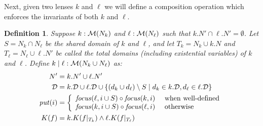\documentclass{article}
\newtheorem{definition}{Definition}
\begin{document}
Next, given two lenses $k$ and $\ell$ we will define a composition operation
which enforces the invariants of both $k$ and $\ell$.
\begin{definition}
    Suppose $k : \mathcal M(N_k)$ and $\ell : \mathcal M(N_\ell)$ such that $k.N' \cap
    \ell.N' = \emptyset$. Let $S = N_k \cap N_\ell$ be the shared domain
    of $k$ and $\ell$, and let $T_k = N_k \cup k.N$ and $T_\ell = N_\ell \cup \ell.N'$
    be called the total domains (including existential variables) of $k$ and $\ell$.
    Define $k\mid\ell : \mathcal M(N_k \cup N_\ell)$ as:
    \begin{align*}
        N' &= k.N' \cup \ell.N' \\
        \mathcal D &= k.\mathcal D \cup \ell.\mathcal D \cup
            \{(d_k \cup d_\ell) \setminus S
            \mid d_k \in k.\mathcal D, d_\ell \in \ell.\mathcal D\} \\
        \mathit{put}(i) &= \left\{\begin{array}{ll}
            \mathit{focus}(\ell,i\cup S) \circ \mathit{focus}(k,i)
                & \mbox{ when well-defined} \\
            \mathit{focus}(k,i\cup S) \circ \mathit{focus}(\ell,i)
                & \mbox{ otherwise}
            \end{array}\right. \\
        K(f) &= k.K(f|_{T_k}) \land \ell.K(f|_{T_\ell})
    \end{align*}
\end{definition}
\end{document}
